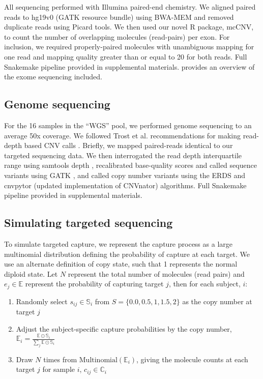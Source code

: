 \documentclass{article}\usepackage[]{graphicx}\usepackage[]{color}
\begin{document}
All sequencing performed with Illumina paired-end chemistry.
We aligned paired reads to hg19v0 (GATK resource bundle) using BWA-MEM \cite{li:2013ab} and removed duplicate reads using Picard tools.
We then used our novel R package, mcCNV, to count the number of overlapping molecules (read-pairs) per exon.
For inclusion, we required properly-paired molecules with unambiguous mapping for one read and mapping quality greater than or equal to 20 for both reads.
Full Snakemake \cite{koster:2012aa} pipeline provided in supplemental materials.
 provides an overview of the exome sequencing included.

\subsection{Genome sequencing}

For the 16 samples in the ``WGS'' pool, we performed genome sequencing to an average 50x coverage.
We followed Trost et al. recommendations for making read-depth based CNV calls \cite{trost:2018aa}.
Briefly, we mapped paired-reads identical to our targeted sequencing data.
We then interrogated the read depth interquartile range using samtools depth \cite{li:2009aa}, recalibrated base-quality scores and called sequence variants using GATK \cite{van-der-auwera:2013aa}, and called copy number variants using the ERDS \cite{zhu:2012aa} and cnvpytor (updated implementation of CNVnator) \cite{abyzov:2011aa} algorithms.
Full Snakemake \cite{koster:2012aa} pipeline provided in supplemental materials.

\subsection{Simulating targeted sequencing}

To simulate targeted capture, we represent the capture process as a large multinomial distribution defining the probability of capture at each target.
We use an alternate definition of copy state, such that 1 represents the normal diploid state.
Let $N$ represent the total number of molecules (read pairs) and $e_j \in \mathbb{E}$ represent the  probability of capturing target $j$, then for each subject, $i$:

\begin{enumerate}
  \item Randomly select $s_{ij} \in \mathbb{S}_i$ from $S = \{0.0, 0.5, 1, 1.5, 2\}$ as the copy number at target $j$
  \item Adjust the subject-specific capture probabilities by the copy number, $\mathbb{E}_i = \frac{\mathbb{E} \odot \mathbb{S}_{i}}{\sum_j \mathbb{E} \odot \mathbb{S}_{i}}$
  \item Draw $N$ times from $\text{Multinomial}(\mathbb{E}_i)$, giving the molecule counts at each target $j$ for sample $i$, $c_{ij} \in \mathbb{C}_i$
\end{enumerate}
\end{document}
